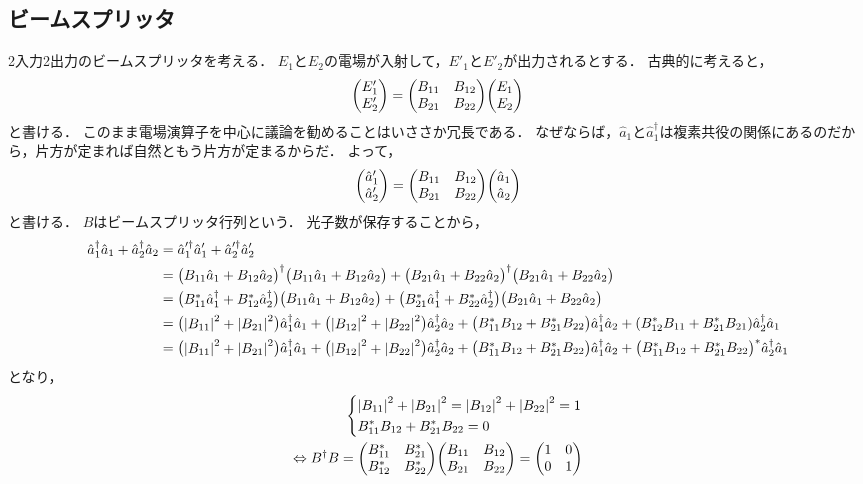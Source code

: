 \documentclass{report}
\begin{document}
  \subsection{ビームスプリッタ}
    2入力2出力のビームスプリッタを考える．
    $E_1$と$E_2$の電場が入射して，$E'_1$と$E'_2$が出力されるとする．
    古典的に考えると，
    \begin{align}
      \mqty(E'_1 \\ E'_2) = \mqty(\xmat*{B}{2}{2})\mqty(E_1 \\ E_2)
    \end{align}
    と書ける．
    このまま電場演算子を中心に議論を勧めることはいささか冗長である．
    なぜならば，$\hat{a}_1$と$\hat{a}_1^{\dag}$は複素共役の関係にあるのだから，片方が定まれば自然ともう片方が定まるからだ．
    よって，
    \begin{align}
      \mqty(\hat{a}_1' \\ \hat{a}_2') = \mqty(\xmat*{B}{2}{2})\mqty(\hat{a}_1 \\ \hat{a}_2)
    \end{align}
    と書ける．
    $B$はビームスプリッタ行列という．
    光子数が保存することから，
    \begin{align}
      \hat{a}_1^{\dag}\hat{a}_1 + \hat{a}_2^{\dag}\hat{a}_2 &= \hat{a}_1'^{\dag}\hat{a}_1' + \hat{a}_2'^{\dag}\hat{a}_2' \\
      &= \mqty(B_{11}\hat{a}_1 + B_{12}\hat{a}_2)^{\dag}\mqty(B_{11}\hat{a}_1 + B_{12}\hat{a}_2) + \mqty(B_{21}\hat{a}_1 + B_{22}\hat{a}_2)^{\dag}\mqty(B_{21}\hat{a}_1 + B_{22}\hat{a}_2) \\ 
      &= \mqty(B_{11}^*\hat{a}_1^{\dag} + B_{12}^*\hat{a}_2^{\dag})\mqty(B_{11}\hat{a}_1 + B_{12}\hat{a}_2) + \mqty(B_{21}^*\hat{a}_1^{\dag} + B_{22}^*\hat{a}_2^{\dag})\mqty(B_{21}\hat{a}_1 + B_{22}\hat{a}_2) \\ 
      &= \mqty(\abs{B_{11}}^2 + \abs{B_{21}}^2)\hat{a}_1^{\dag}\hat{a}_1 + \mqty(\abs{B_{12}}^2 + \abs{B_{22}}^2)\hat{a}_2^{\dag}\hat{a}_2 + \mqty(B_{11}^*B_{12} + B_{21}^*B_{22})\hat{a}_1^{\dag}\hat{a}_2 + \qty(B_{12}^*B_{11} + B_{21}^*B_{21})\hat{a}_2^{\dag}\hat{a}_1 \\ 
      &= \mqty(\abs{B_{11}}^2 + \abs{B_{21}}^2)\hat{a}_1^{\dag}\hat{a}_1 + \mqty(\abs{B_{12}}^2 + \abs{B_{22}}^2)\hat{a}_2^{\dag}\hat{a}_2 + \mqty(B_{11}^*B_{12} + B_{21}^*B_{22})\hat{a}_1^{\dag}\hat{a}_2 + \mqty(B_{11}^*B_{12} + B_{21}^*B_{22})^*\hat{a}_2^{\dag}\hat{a}_1
    \end{align}
    となり，
    \begin{align}
      \begin{dcases}
        \abs{B_{11}}^2 + \abs{B_{21}}^2 = \abs{B_{12}}^2 + \abs{B_{22}}^2 = 1 \\ 
        B_{11}^*B_{12} + B_{21}^*B_{22} = 0\\ 
      \end{dcases} \\ 
      \Leftrightarrow 
      B^{\dag}B = \mqty(B_{11}^* & B_{21}^* \\ B_{12}^* & B_{22}^*)\mqty(B_{11} & B_{12} \\ B_{21} & B_{22}) = \mqty(1 & 0 \\ 0 & 1)
    \end{align}
\end{document}

